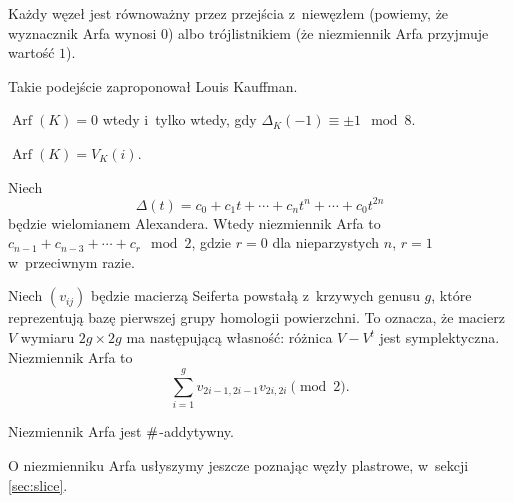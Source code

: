 Każdy węzeł jest równoważny przez przejścia z~niewęzłem (powiemy, że wyznacznik Arfa wynosi $0$) albo trójlistnikiem (że niezmiennik Arfa przyjmuje wartość $1$).

Takie podejście zaproponował Louis Kauffman.

\begin{proposition}[Murasugi]
    \label{arf_murasugi}
    $\operatorname{Arf}(K) = 0$ wtedy i~tylko wtedy, gdy $\Delta_K(-1) \equiv \pm 1 \mod 8$.
\end{proposition}

\begin{proposition}[Jones, 1985]
    $\operatorname{Arf}(K) = V_K(i)$.
\end{proposition}

\begin{proposition}[Robertello]
    Niech
    \begin{equation}
        \Delta (t)=c_{0}+c_{1}t+\cdots +c_{n}t^{n}+\cdots +c_{0}t^{2n}
    \end{equation}
    będzie wielomianem Alexandera.
    Wtedy niezmiennik Arfa to $ c_{n-1}+c_{n-3}+\cdots +c_{r}\mod 2$, gdzie $r = 0$ dla nieparzystych $n$, $r = 1$ w~przeciwnym razie.
\end{proposition}

\begin{proposition}
    Niech $(v_{ij})$ będzie macierzą Seiferta powstałą z~krzywych genusu $g$, które reprezentują bazę pierwszej grupy homologii powierzchni.
    To oznacza, że macierz $V$ wymiaru $2g \times 2g$ ma następującą własność: różnica $V - V^t$ jest symplektyczna.
    Niezmiennik Arfa to
    \begin{equation}
        \sum^g_{i=1}v_{2i-1,2i-1}v_{2i,2i} \pmod 2.
    \end{equation}
\end{proposition}

\begin{proposition}
    Niezmiennik Arfa jest $\mathbin{\#}$-addytywny.
\end{proposition}

O niezmienniku Arfa usłyszymy jeszcze poznając węzły plastrowe, w~sekcji \ref{sec:slice}.

